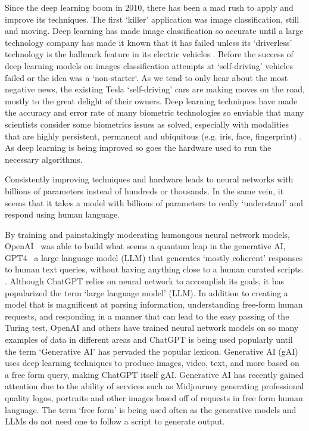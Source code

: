 Since the deep learning boom in 2010, there has been a mad rush to apply and improve its techniques.
The first `killer' application was image classification, still and moving.
Deep learning has made image classification so accurate until a large technology company has made it known that it has failed unless its `driverless' technology is the hallmark feature in its electric vehicles . 
Before the success of deep learning models on images classification attempts at `self-driving' vehicles failed or the idea was a `non-starter`.
As we tend to only hear about the most negative news, the existing Tesla `self-driving' cars are making moves on the road, mostly to the great delight of their owners.
Deep learning techniques have made the accuracy and error rate of many biometric technologies so enviable that many scientists consider some biometrics issues as solved, especially with modalities that are highly persistent, permanent and ubiquitous (e.g. iris, face, fingerprint) .
As deep learning is being improved so goes the hardware used to run the necessary algorithms.

Consistently improving techniques and hardware leads to neural networks with billions of parameters instead of hundreds or thousands.
In the same vein, it seems that it takes a model with billions of parameters to really `understand' and respond using human language.

By training and painstakingly moderating humongous neural network models, OpenAI~\cite{Bavarian:2022,Weng:2022} was able to build what seems a quantum leap in the generative AI, GPT4~\cite{OpenAI:2023_gpt4} a large language model (LLM) that generates `mostly coherent' responses to human text queries, without having anything close to a human curated scripts. .
Although ChatGPT relies on neural network to accomplish its goals, it has popularized the term `large language model' (LLM).
In addition to creating a model that is magnificent at parsing information, understanding free-form human requests, and responding in a manner that can lead to the easy passing of the Turing test, OpenAI and others have trained neural network models on so many examples of data in different areas and ChatGPT is being used popularly until the term `Generative AI' has pervaded the popular lexicon.
Generative AI (gAI) uses deep learning techniques to produce images, video, text, and more based on a free form query, making ChatGPT itself gAI.
Generative AI has recently gained attention due to the ability of services such as Midjourney  generating professional quality logos, portraits and other images based off of requests in free form human language.
The term `free form' is being used often as the generative models and LLMs do not need one to follow a script to generate output.

